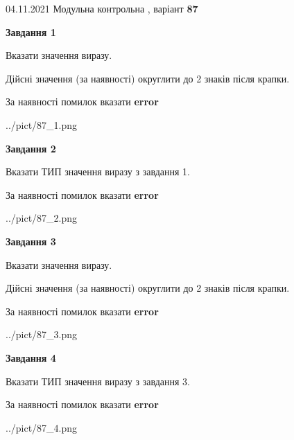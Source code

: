 \documentclass[11pt, ukrainian]{article}
\begin{document}
{04.11.2021 Модульна контрольна , варіант  \No \textbf { 87 }\par}
{
\begin {large}
{\begin {center}\textbf{Завдання 1}\end {center}}\par
Вказати значення виразу. \par
Дійсні значення (за наявності) округлити до 2 знаків після крапки. \par
За наявності помилок вказати \textbf{error}

\begin{center}
	{../pict/87_1.png}
\end{center}
\newpage

{\begin {center}\textbf{Завдання 2}\end {center}}\par
Вказати ТИП значення виразу з завдання 1. \par
За наявності помилок вказати \textbf{error}

\begin{center}
	{../pict/87_2.png}
\end{center}
\newpage

{\begin {center}\textbf{Завдання 3}\end {center}}\par
Вказати значення виразу. \par
Дійсні значення (за наявності) округлити до 2 знаків після крапки. \par
За наявності помилок вказати \textbf{error}

\begin{center}
	{../pict/87_3.png}
\end{center}
\newpage

{\begin {center}\textbf{Завдання 4}\end {center}}\par
Вказати ТИП значення виразу з завдання 3. \par
За наявності помилок вказати \textbf{error}

\begin{center}
	{../pict/87_4.png}
\end{center}
\newpage


\end{large}}
\end{document}
